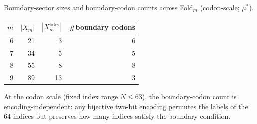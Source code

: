 Boundary-sector sizes and boundary-codon counts across Fold$_m$ (codon-scale; $\mu^\ast$).

\begin{center}
\small
\setlength{\tabcolsep}{6pt}
\renewcommand{\arraystretch}{1.15}
\begin{tabular}{r r r r}
\toprule
$m$ & $|X_m|$ & $|X_m^{\mathrm{bdry}}|$ & \#boundary codons \\
\midrule
6 & 21 & 3 & 6 \\
7 & 34 & 5 & 5 \\
8 & 55 & 8 & 8 \\
9 & 89 & 13 & 3 \\
\bottomrule
\end{tabular}
\end{center}

At the codon scale (fixed index range $N\le 63$), the boundary-codon count is encoding-independent: any bijective two-bit encoding permutes the labels of the $64$ indices but preserves how many indices satisfy the boundary condition.

